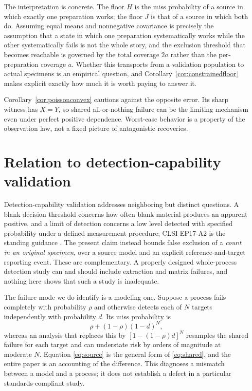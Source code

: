 \documentclass[11pt]{article}
\theoremstyle{remark}\newtheorem{remark}[theorem]{Remark}
\begin{document}
The interpretation is concrete. The floor $H$ is the miss probability of a source
in which exactly one preparation works; the floor $J$ is that of a source in
which both do. Assuming equal means and nonnegative covariance is precisely the
assumption that a state in which one preparation systematically works while the
other systematically fails is not the whole story, and the exclusion threshold
that becomes reachable is governed by the total coverage $2a$ rather than the
per-preparation coverage $a$. Whether this transports from a validation
population to actual specimens is an empirical question, and
Corollary~\ref{cor:constrainedfloor} makes explicit exactly how much it is worth
paying to answer it.

Corollary~\ref{cor:poissonconvex} cautions against the opposite error. Its sharp
witness has $X=Y$, so shared all-or-nothing failure can be the limiting
mechanism even under perfect positive dependence. Worst-case behavior is a
property of the observation law, not a fixed picture of antagonistic recoveries.

\section{Relation to detection-capability validation}\label{sec:standards}
Detection-capability validation addresses neighboring but distinct questions. A
blank decision threshold concerns how often blank material produces an apparent
positive, and a limit of detection concerns a low level detected with specified
probability under a defined measurement procedure; CLSI EP17-A2 is the standing
guidance \cite{clsi2012}. The present claim instead bounds false exclusion of a
\emph{count in an original specimen}, over a source model and an explicit
reference-and-target reporting event. These are complementary. A properly
designed whole-process detection study can and should include extraction and
matrix failures, and nothing here shows that such a study is inadequate.

The failure mode we do identify is a modeling one. Suppose a process fails
completely with probability $\rho$ and otherwise detects each of $N$ targets
independently with probability $d$. Its miss probability is
\begin{equation}\label{eq:shared}
\rho+(1-\rho)(1-d)^N,
\end{equation}
whereas an analysis that replaces this by $[1-(1-\rho)d]^N$ resamples the shared
failure for each target and can understate risk by orders of magnitude at
moderate $N$. Equation \eqref{eq:source} is the general form of
\eqref{eq:shared}, and the entire paper is an accounting of the difference.
This diagnoses a mismatch between a model and a process; it does not establish a
defect in a particular standards-compliant study.
\end{document}
